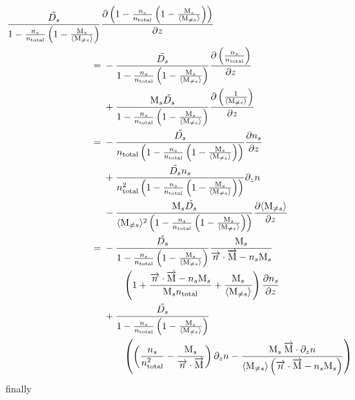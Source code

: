 \begin{equation}
\begin{split}
\frac{\tilde{D_s}}{1-\frac{n_s}{n_\text{total}}\left(1 - \frac{\text{M}_s}{\langle\text{M}_{\neq s}\rangle}\right)}
 &  \frac{\partial\left(1-\frac{n_s}{n_\text{total}}\left(1 - \frac{\text{M}_s}{\langle\text{M}_{\neq s}\rangle}\right)\right)}{\partial z} \\
        = &\; - \frac{\tilde{D_s}}{1-\frac{n_s}{n_\text{total}}\left(1 - \frac{\text{M}_s}{\langle\text{M}_{\neq s}\rangle}\right)}
                 \frac{\partial\left(\frac{n_s}{n_\text{total}}\right)}{\partial z}\\
          &\; + \frac{\text{M}_s\tilde{D_s}}{1-\frac{n_s}{n_\text{total}}\left(1 - \frac{\text{M}_s}{\langle\text{M}_{\neq s}\rangle}\right)}
                 \frac{\partial\left(\frac{1}{\langle\text{M}_{\neq s}\rangle}\right)}{\partial z}\\
        = &\; - \frac{\tilde{D_s}}{n_\text{total}\left(1-\frac{n_s}{n_\text{total}}\left(1 - \frac{\text{M}_s}{\langle\text{M}_{\neq s}\rangle}\right)\right)}
                 \frac{\partial n_s}{\partial z}\\
          &\; + \frac{\tilde{D_s}n_s}{n_\text{total}^2\left(1-\frac{n_s}{n_\text{total}}\left(1 - \frac{\text{M}_s}{\langle\text{M}_{\neq s}\rangle}\right)\right)}
                 \partial_{z}{n}\\
          &\; - \frac{\text{M}_s\tilde{D_s}}{\langle\text{M}_{\neq s}\rangle^2\left(1-\frac{n_s}{n_\text{total}}\left(1 - \frac{\text{M}_s}{\langle\text{M}_{\neq s}\rangle}\right)\right)}
                 \frac{\partial\langle\text{M}_{\neq s}\rangle}{\partial z}\\
        = &\; - \frac{\tilde{D_s}}{1-\frac{n_s}{n_\text{total}}\left(1 - \frac{\text{M}_s}{\langle\text{M}_{\neq s}\rangle}\right)}
                  \frac{\text{M}_s}{\overrightarrow{n}\cdot\overrightarrow{\text{M}} - n_s\text{M}_s} \\
          &\;\qquad   \left(1 + \frac{\overrightarrow{n}\cdot\overrightarrow{\text{M}} - n_s\text{M}_s}{\text{M}_sn_\text{total}} + \frac{\text{M}_s}{\langle\text{M}_{\neq s}\rangle}\right) 
                        \frac{\partial n_s}{\partial z} \\
          &\; + \frac{\tilde{D_s}}{1-\frac{n_s}{n_\text{total}}\left(1 - \frac{\text{M}_s}{\langle\text{M}_{\neq s}\rangle}\right)} \\
          &\;\qquad \left(\left(\frac{n_s}{n_\text{total}^2} - \frac{\text{M}_s}{\overrightarrow{n}\cdot\overrightarrow{\text{M}}}\right)\partial_{z}{n}
                        - \frac{\text{M}_s\:\overrightarrow{\text{M}}\cdot\partial_{z}{n}}
                               {\langle\text{M}_{\neq s}\rangle\left(\overrightarrow{n}\cdot\overrightarrow{\text{M}} - n_s\text{M}_s\right)}
                    \right)\\
\end{split}
\end{equation}
finally
